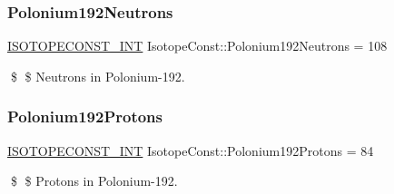 \subsubsection{\texorpdfstring{Polonium192\+Neutrons}{Polonium192Neutrons}}
{\footnotesize\ttfamily \mbox{\hyperlink{group___isotope_const-_macros_ga5f18360b3e99483a35c32d789e62621c}{I\+S\+O\+T\+O\+P\+E\+C\+O\+N\+S\+T\+\_\+\+I\+NT}} Isotope\+Const\+::\+Polonium192\+Neutrons = 108}

\$ \$ Neutrons in Polonium-\/192. \mbox{\label{group___isotope_const-_polonium-_po192_ga5e8026bd331f448b8506d505d7c798e6}} 
\subsubsection{\texorpdfstring{Polonium192\+Protons}{Polonium192Protons}}
{\footnotesize\ttfamily \mbox{\hyperlink{group___isotope_const-_macros_ga5f18360b3e99483a35c32d789e62621c}{I\+S\+O\+T\+O\+P\+E\+C\+O\+N\+S\+T\+\_\+\+I\+NT}} Isotope\+Const\+::\+Polonium192\+Protons = 84}

\$ \$ Protons in Polonium-\/192. 